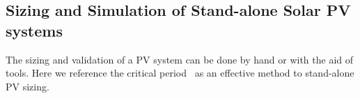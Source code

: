 \subsection{Sizing and Simulation of Stand-alone Solar PV systems}
The sizing and validation of a PV system can be done by hand or with the aid of tools. Here we reference the critical period~\cite{Pinho} as an effective method to stand-alone PV sizing.
%
%

